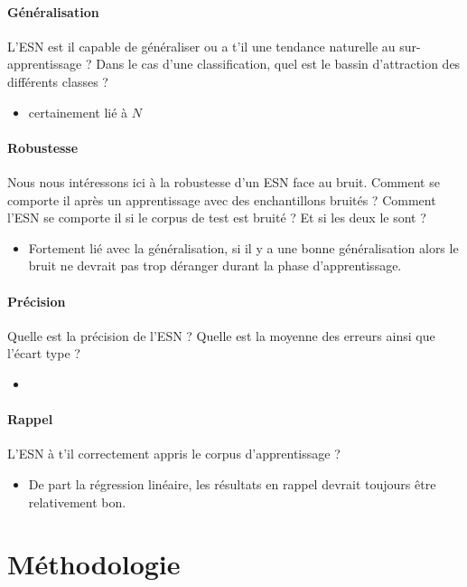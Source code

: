 \documentclass[12pt]{article}
\begin{document}
\paragraph{Généralisation}
L'ESN est il capable de généraliser ou a t'il une tendance naturelle au sur-apprentissage ? Dans le cas d'une classification, quel est le bassin d'attraction des différents classes ?

\begin{itemize}
\item certainement lié à $N$
\end{itemize}


\paragraph{Robustesse}
Nous nous intéressons ici à la robustesse d'un ESN face au bruit. Comment se comporte il après un apprentissage avec des enchantillons bruités ? Comment l'ESN se comporte il si le corpus de test est bruité ? Et si les deux le sont ?

\begin{itemize}
\item Fortement lié avec la généralisation, si il y a une bonne généralisation alors le bruit ne devrait pas trop déranger durant la phase d'apprentissage.
\end{itemize}


\paragraph{Précision}
Quelle est la précision de l'ESN ? Quelle est la moyenne des erreurs ainsi que l'écart type ?

\begin{itemize}
\item
\end{itemize}

\paragraph{Rappel}
L'ESN à t'il correctement appris le corpus d'apprentissage ?

\begin{itemize}
\item De part la régression linéaire, les résultats en rappel devrait toujours être relativement bon.
\end{itemize}


\section{Méthodologie}




\end{document}
